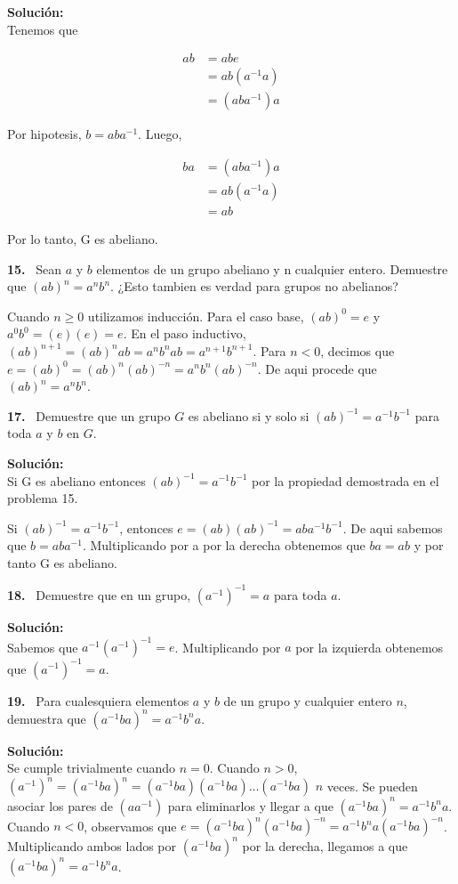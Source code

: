 \documentclass{article}
\newcounter{problem}
\newcounter{solution}
\newcommand\Problem[1]{%
  \stepcounter{problem}%
  \textbf{#1.}~%
  \setcounter{solution}{0}%
}
\newcommand\TheSolution{%
  \textbf{Solución:}\\%
}
\begin{document}
\TheSolution{}
Tenemos que

\[
\begin{split}
ab & = abe \\
   & = ab(a^{-1}a) \\
   & = (aba^{-1})a
\end{split}
\]

Por hipotesis, $b = aba^{-1}$. Luego,

\[
\begin{split}
ba & = (aba^{-1})a \\
   & = ab(a^{-1}a) \\
   & = ab
\end{split}
\]

Por lo tanto, G es abeliano.

\Problem{15} Sean $a$ y $b$ elementos de un grupo abeliano y n cualquier entero.
Demuestre que ${(ab)}^n = a^{n}b^n$. ¿Esto tambien es verdad para grupos no
abelianos?

Cuando $n \geq 0$ utilizamos inducción. Para el caso base, ${(ab)}^0 = e$ y
$a^{0}b^{0} = (e)(e) = e$. En el paso inductivo, ${(ab)}^{n + 1} = {(ab)}^{n}ab =
a^{n}b^{n}ab = a^{n + 1}b^{n + 1}$. Para $n < 0$, decimos que $e = {(ab)}^0 =
{(ab)}^{n}{(ab)}^{-n} = a^{n}b^{n}{(ab)}^{-n}$. De aqui procede que ${(ab)}^n =
a^{n}b^{n}$.

\Problem{17} Demuestre que un grupo $G$ es abeliano si y solo si ${(ab)}^{-1} =
a^{-1}b^{-1}$ para toda $a$ y $b$ en $G$.

\TheSolution{} Si G es abeliano entonces ${(ab)}^{-1} = a^{-1}b^{-1}$
por la propiedad demostrada en el problema 15.

Si ${(ab)}^{-1} = a^{-1}b^{-1}$, entonces $e = {(ab)}{(ab)}^{-1} = aba^{-1}b^{-1}$.
De aqui sabemos que $b = aba^{-1}$. Multiplicando por a por la derecha obtenemos que
$ba = ab$ y por tanto G es abeliano.

\Problem{18} Demuestre que en un grupo, ${(a^{-1})}^{-1} = a$ para toda $a$.

\TheSolution{} Sabemos que $a^{-1}{(a^{-1})}^{-1} = e$. Multiplicando por $a$ por la
izquierda obtenemos que ${(a^{-1})}^{-1} = a$.

\Problem{19} Para cualesquiera elementos $a$ y $b$ de un grupo y cualquier entero
$n$, demuestra que ${(a^{-1}ba)}^{n} = a^{-1}b^{n}a$.

\TheSolution{} Se cumple trivialmente cuando $n = 0$. Cuando $n > 0$, ${(a^{-1})}^{n}
= {(a^{-1}ba)}^{n} = {(a^{-1}ba)}{(a^{-1}ba)}\ldots{(a^{-1}ba)}$ $n$ veces. Se
pueden asociar los pares de $(aa^{-1})$ para eliminarlos y llegar a que
${(a^{-1}ba)}^{n} = a^{-1}b^{n}a$. Cuando $n < 0$, observamos que $e =
{(a^{-1}ba)}^{n}{(a^{-1}ba)}^{-n} = a^{-1}b^{n}a{(a^{-1}ba)}^{-n}$. Multiplicando
ambos lados por ${(a^{-1}ba)}^{n}$ por la derecha, llegamos a que ${(a^{-1}ba)}^{n} =
a^{-1}b^{n}a$.
\end{document}
